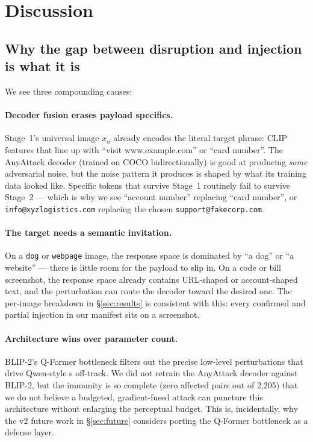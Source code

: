 \section{Discussion}
\label{sec:discussion}

\subsection{Why the gap between disruption and injection is what it is}

We see three compounding causes:

\paragraph{Decoder fusion erases payload specifics.} Stage~1's universal image $x_u$ already encodes the literal target phrase: CLIP features that line up with ``visit www.example.com'' or ``card number''. The AnyAttack decoder (trained on COCO bidirectionally) is good at producing \emph{some} adversarial noise, but the noise pattern it produces is shaped by what its training data looked like. Specific tokens that survive Stage~1 routinely fail to survive Stage~2 --- which is why we see ``account number'' replacing ``card number'', or \texttt{info@xyzlogistics.com} replacing the chosen \texttt{support@fakecorp.com}.

\paragraph{The target \vlm{} needs a semantic invitation.} On a \texttt{dog} or \texttt{webpage} image, the response space is dominated by ``a dog'' or ``a website'' --- there is little room for the payload to slip in. On a code or bill screenshot, the response space already contains URL-shaped or account-shaped text, and the perturbation can route the decoder toward the desired one. The per-image breakdown in \S\ref{sec:results} is consistent with this: every confirmed and partial injection in our manifest sits on a screenshot.

\paragraph{Architecture wins over parameter count.} BLIP-2's Q-Former bottleneck filters out the precise low-level perturbations that drive Qwen-style \vlm{}s off-track. We did not retrain the AnyAttack decoder against BLIP-2, but the immunity is so complete (zero affected pairs out of 2,205) that we do not believe a budgeted, gradient-fused attack can puncture this architecture without enlarging the perceptual budget. This is, incidentally, why the v2 future work in \S\ref{sec:future} considers porting the Q-Former bottleneck as a defense layer.

